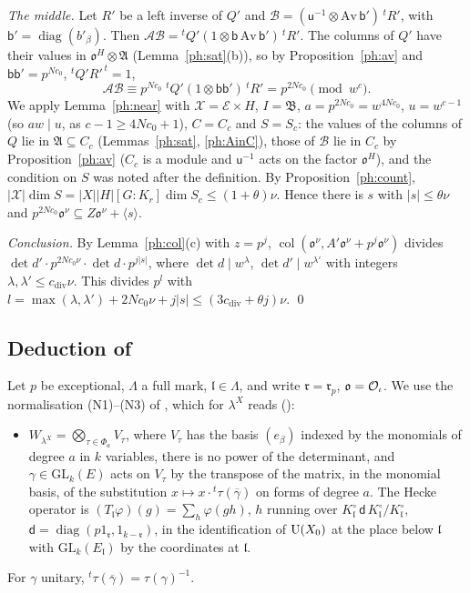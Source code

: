 \documentclass[10pt]{amsart}
\theoremstyle{definition}
\theoremstyle{remark}
\providecommand{\auGL}{\mathrm{GL}}
\providecommand{\auPa}{\Phi_a}
\providecommand{\aubar}[1]{\overline{#1}}
\providecommand{\aucol}{\operatorname{col}}
\providecommand{\pao}{\mathfrak o}
\providecommand{\phA}{\mathfrak A}
\providecommand{\phB}{\mathfrak B}
\providecommand{\phcd}{c_{\mathrm{div}}}
\begin{document}
\emph{The middle.} Let $R'$ be a left inverse of $Q'$ and $\mathcal B=(\mathsf u^{-1}\otimes
\mathrm{Av}\,\mathsf b')\,{}^tR'$, with $\mathsf b'=\operatorname{diag}(b'_\beta)$. Then
$\mathcal A\mathcal B={}^tQ'(1\otimes\mathsf b\,\mathrm{Av}\,\mathsf b')\,{}^tR'$. The columns of
$Q'$ have their values in $\pao^H\otimes\phA$ (Lemma~\ref{ph:sat}(b)), so by
Proposition~\ref{ph:av} and $\mathsf b\mathsf b'=p^{Nc_0}$, ${}^tQ'R'^{\,t}=1$,
\[
\mathcal A\mathcal B\equiv p^{Nc_0}\;{}^tQ'(1\otimes\mathsf b\mathsf b')\,{}^tR'=p^{2Nc_0}
\pmod{w^c}.
\]
We apply Lemma~\ref{ph:near} with $\mathcal X=\mathcal E\times H$, $I=\phB$, $a=p^{2Nc_0}=w^{4Nc_0}$,
$u=w^{c-1}$ (so $aw\mid u$, as $c-1\ge4Nc_0+1$), $C=C_c$ and $S=S_c$: the values of the columns of
$Q$ lie in $\phA\subseteq C_c$ (Lemmas~\ref{ph:sat}, \ref{ph:AinC}), those of $\mathcal B$ lie in
$C_c$ by Proposition~\ref{ph:av} ($C_c$ is a module and $\mathsf u^{-1}$ acts on the factor
$\pao^H$), and the condition on $S$ was noted after the definition. By
Proposition~\ref{ph:count}, $|\mathcal X|\dim S=|X||H|[G:K_r]\dim S_c\le(1+\theta)\nu$. Hence there
is $s$ with $|s|\le\theta\nu$ and $p^{2Nc_0}\pao^\nu\subseteq Z\pao^\nu+\langle s\rangle$.

\emph{Conclusion.} By Lemma~\ref{ph:col}(c) with $z=p^j$,
$\aucol(\pao^\nu,A'\pao^\nu+p^j\pao^\nu)$ divides $\det d'\cdot p^{2Nc_0\nu}\cdot\det d\cdot
p^{j|s|}$, where $\det d\mid w^\lambda$, $\det d'\mid w^{\lambda'}$ with integers $\lambda,\lambda'\le\phcd
\nu$. This divides $p^l$ with $l=\max(\lambda,\lambda')+2Nc_0\nu+j|s|\le(3\phcd+\theta j)\nu$.
\qed

\subsection{Deduction of \texorpdfstring{{\cite[Lemma~4.19]{P49}}}{[Theta, Lemma~4.19]}}\label{ph:ss-ded}
Let $p$ be exceptional, $\Lambda$ a full mark, $\mathfrak l\in\Lambda$, and write
$\mathfrak r=\mathfrak r_p$, $\pao=\auO_\iota$. We use the normalisation (N1)--(N3) of {\cite[\S6.1]{P49}}, which for $\lambda^X$ reads
({\cite[Remark~6.2]{P49}}):
\begin{itemize}
\item[(N)] $W_{\lambda^X}=\bigotimes_{\tau\in\auPa}V_\tau$, where $V_\tau$ has the basis
$(e_\beta)$ indexed by the monomials of degree $a$ in $k$ variables, there is no power of the
determinant, and $\gamma\in\auGL_k(E)$ acts on $V_\tau$ by the transpose of the matrix, in the
monomial basis, of the substitution $x\mapsto x\cdot{}^t\tau(\aubar\gamma)$ on forms of degree
$a$. The Hecke operator is $(T_{\mathfrak l}\varphi)(g)=\sum_{h}\varphi(gh)$, $h$ running over
$K^\circ_{\mathfrak l}\,\mathsf d\,K^\circ_{\mathfrak l}/K^\circ_{\mathfrak l}$,
$\mathsf d=\operatorname{diag}(p1_{\mathfrak r},1_{k-\mathfrak r})$, in the identification of
$\mathrm U(X_0)$ at the place below $\mathfrak l$ with $\auGL_k(E_{\mathfrak l})$ by the coordinates at
$\mathfrak l$.
\end{itemize}
For $\gamma$ unitary, ${}^t\tau(\aubar\gamma)=\tau(\gamma)^{-1}$.
\end{document}
